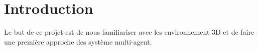 \chapter*{Introduction}
\thispagestyle{fancy}
Le but de ce projet est de nous familiariser avec les environnement 3D et de faire une première approche des système multi-agent.

 

